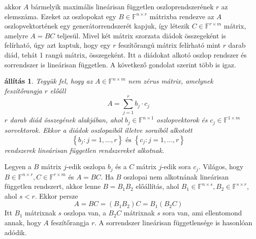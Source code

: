 \documentclass[9pt, a4paper, showtrims]{memoir}
\makeatletter
\renewenvironment{proof}[1][\proofname]
    {\par\pushQED{\qed}%
    \normalfont \topsep6\p@\@plus6\p@\relax
    \trivlist
    \item[\hskip\labelsep
        \itshape
    #1\@addpunct{:}]\ignorespaces}
    {\popQED\endtrivlist\@endpefalse}
\theoremstyle{plain}
\newtheorem{proposition}{állítás}[chapter]
\theoremstyle{remark}
\theoremstyle{definition}
\makeatother
\begin{document}
akkor $A$ bármelyik maximális lineárisan független oszloprendszerének $r$ az elemszáma.
Ezeket az oszlopokat egy $B\in\mathbb{F}^{n\times r}$ mátrixba rendezve az $A$ oszlopvektortének
egy generátorrendszerét kapjuk,
így létezik $C\in\mathbb{F}^{r\times m}$ mátrix, amelyre $A=BC$ teljesül.
Mivel két mátrix szorzata diádok összegeként is felírható, 
úgy azt kaptuk, hogy egy $r$ feszítőrangú mátrix felírható mint $r$ darab diád,
tehát 1 rangú mátrix, összegeként.
Itt a diádokat alkotó oszlop rendszer és sorrendszer is lineárisan független.
A következő gondolat szerint több is igaz.
\begin{proposition}
	Tegyük fel, hogy az $A\in\mathbb{F}^{n\times m}$ nem zérus mátrix, 
    amelynek feszítőrangja $r$ előáll
	\[
		A=\sum_{j=1}^rb_j\cdot c_j
	\]
	$r$ darab diád összegének alakjában,
    ahol $b_j\in\mathbb{F}^{n\times 1}$ oszlopvektorok és $c_j\in\mathbb{F}^{1\times m}$ sorvektorok.
	Ekkor a diádok oszlopaiból illetve soraiból alkotott
	\[
		\left\{ b_j:j=1,\ldots,r \right\} \text{ és }
		\left\{ c_j:j=1,\ldots,r \right\}
	\]
	rendszerek lineárisan független rendszereket alkotnak.
\end{proposition}
\begin{proof}
	Legyen a $B$ mátrix $j$-edik oszlopa $b_j$ és a $C$ mátrix $j$-edik sora $c_j$.
	Világos, hogy $B\in\mathbb{F}^{n\times r}, C\in\mathbb{F}^{r\times m}$ és
	$A=BC$.
	Ha $B$ oszlopai nem alkotnának lineárisan független rendszert, akkor
	lenne $B=B_1B_2$ előállítás,
	ahol $B_1\in\mathbb{F}^{n\times s}, B_2\in\mathbb{F}^{s\times r}$,
	ahol $s<r$.
	Ekkor persze
	\[
		A=BC=\left( B_1B_2 \right)C=B_1\left( B_2C \right)
	\]
	Itt $B_1$ mátrixnak $s$ oszlopa van, a
	$B_2C$ mátrixnak $s$ sora van,
	ami ellentomond annak, hogy $A$ feszítőrangja $r$.
	A sorrendszer lineárisan függetlensége is hasonlóan adódik.
\end{proof}
\end{document}
